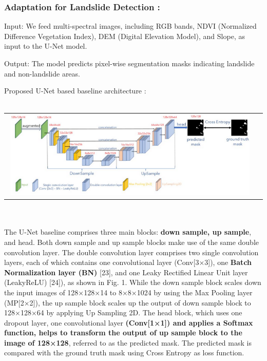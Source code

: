 \documentclass[12pt,a4paper]{report}
\begin{document}
\subsubsection{Adaptation for Landslide Detection :}


Input: We feed multi-spectral images, including RGB bands, NDVI (Normalized Difference Vegetation Index), DEM (Digital Elevation Model), and Slope, as input to the U-Net model.

Output: The model predicts pixel-wise segmentation masks indicating landslide and non-landslide areas.

Proposed U-Net based baseline architecture \cite{ra_unet} :
\\
\\
		    \begin{tabular}{c c}
 \includegraphics[width=0.98\textwidth]{unet}
 
    \end{tabular}
    \\
    \\
    The U-Net baseline comprises three main blocks: \textbf{down sample, up sample}, and head. Both down sample and up sample blocks make use of the same double convolution layer. The double convolution layer comprises two single convolution layers, each of which contains one convolutional layer (Conv[3×3]), one \textbf{Batch Normalization layer (BN)} [23], and one Leaky Rectified Linear Unit layer (LeakyReLU) [24]), as shown in Fig. 1. While the down sample block scales down the input images of 128×128×14 to 8×8×1024 by using the Max Pooling layer (MP[2×2]), the up sample block scales up the output of down sample block to 128×128×64 by applying Up Sampling 2D. The head block, which uses one dropout layer, one convolutional layer \textbf{(Conv[1×1]) and applies a Softmax function, helps to transform the output of up sample block to the image of 128×128}, referred to as the predicted mask. The predicted mask is compared with the ground truth mask using Cross Entropy as loss function.
    
\end{document}
